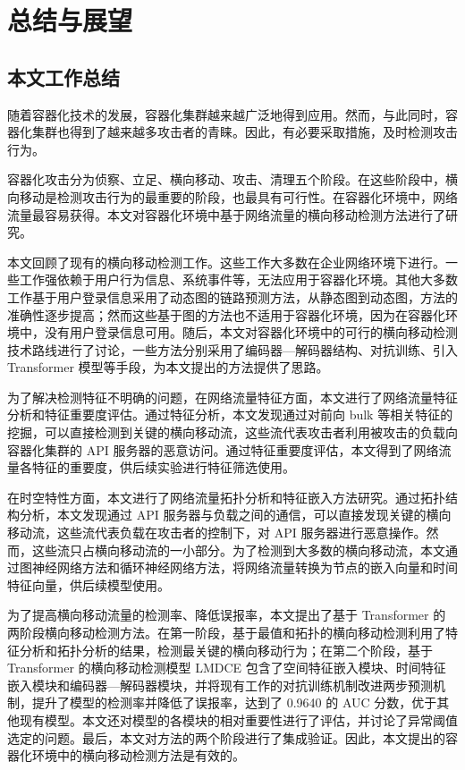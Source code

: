 \chapter{总结与展望}{
{
\let\cleardoublepage\relax
}

\section{本文工作总结}

随着容器化技术的发展，容器化集群越来越广泛地得到应用。然而，与此同时，容器化集群也得到了越来越多攻击者的青睐。因此，有必要采取措施，及时检测攻击行为。

容器化攻击分为侦察、立足、横向移动、攻击、清理五个阶段。在这些阶段中，横向移动是检测攻击行为的最重要的阶段，也最具有可行性。在容器化环境中，网络流量最容易获得。本文对容器化环境中基于网络流量的横向移动检测方法进行了研究。

本文回顾了现有的横向移动检测工作。这些工作大多数在企业网络环境下进行。一些工作强依赖于用户行为信息、系统事件等，无法应用于容器化环境。其他大多数工作基于用户登录信息采用了动态图的链路预测方法，从静态图到动态图，方法的准确性逐步提高；然而这些基于图的方法也不适用于容器化环境，因为在容器化环境中，没有用户登录信息可用。随后，本文对容器化环境中的可行的横向移动检测技术路线进行了讨论，一些方法分别采用了编码器—解码器结构、对抗训练、引入 Transformer 模型等手段，为本文提出的方法提供了思路。

为了解决检测特征不明确的问题，在网络流量特征方面，本文进行了网络流量特征分析和特征重要度评估。通过特征分析，本文发现通过对前向 bulk 等相关特征的挖掘，可以直接检测到关键的横向移动流，这些流代表攻击者利用被攻击的负载向容器化集群的 API 服务器的恶意访问。通过特征重要度评估，本文得到了网络流量各特征的重要度，供后续实验进行特征筛选使用。

在时空特性方面，本文进行了网络流量拓扑分析和特征嵌入方法研究。通过拓扑结构分析，本文发现通过 API 服务器与负载之间的通信，可以直接发现关键的横向移动流，这些流代表负载在攻击者的控制下，对 API 服务器进行恶意操作。然而，这些流只占横向移动流的一小部分。为了检测到大多数的横向移动流，本文通过图神经网络方法和循环神经网络方法，将网络流量转换为节点的嵌入向量和时间特征向量，供后续模型使用。

为了提高横向移动流量的检测率、降低误报率，本文提出了基于 Transformer 的两阶段横向移动检测方法。在第一阶段，基于最值和拓扑的横向移动检测利用了特征分析和拓扑分析的结果，检测最关键的横向移动行为；在第二个阶段，基于 Transformer 的横向移动检测模型 LMDCE 包含了空间特征嵌入模块、时间特征嵌入模块和编码器—解码器模块，并将现有工作的对抗训练机制改进两步预测机制，提升了模型的检测率并降低了误报率，达到了 0.9640 的 AUC 分数，优于其他现有模型。本文还对模型的各模块的相对重要性进行了评估，并讨论了异常阈值选定的问题。最后，本文对方法的两个阶段进行了集成验证。因此，本文提出的容器化环境中的横向移动检测方法是有效的。

}
